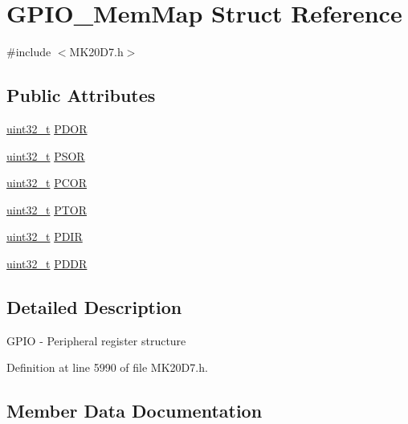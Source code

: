 \hypertarget{struct_g_p_i_o___mem_map}{}\section{G\+P\+I\+O\+\_\+\+Mem\+Map Struct Reference}
\label{struct_g_p_i_o___mem_map}


{\ttfamily \#include $<$M\+K20\+D7.\+h$>$}

\subsection*{Public Attributes}
\begin{DoxyCompactItemize}
\item 
\hyperlink{_p_e___types_8h_a33594304e786b158f3fb30289278f5af}{uint32\+\_\+t} \hyperlink{struct_g_p_i_o___mem_map_aaf4f486952b9b4680e270ce6266122fd}{P\+D\+OR}
\item 
\hyperlink{_p_e___types_8h_a33594304e786b158f3fb30289278f5af}{uint32\+\_\+t} \hyperlink{struct_g_p_i_o___mem_map_a14833f065ec123137ccce5ab873b5879}{P\+S\+OR}
\item 
\hyperlink{_p_e___types_8h_a33594304e786b158f3fb30289278f5af}{uint32\+\_\+t} \hyperlink{struct_g_p_i_o___mem_map_a996f6a159415a5c0d0683346e950e7fb}{P\+C\+OR}
\item 
\hyperlink{_p_e___types_8h_a33594304e786b158f3fb30289278f5af}{uint32\+\_\+t} \hyperlink{struct_g_p_i_o___mem_map_a03faa882b5f4554ff4c11954c2d8759b}{P\+T\+OR}
\item 
\hyperlink{_p_e___types_8h_a33594304e786b158f3fb30289278f5af}{uint32\+\_\+t} \hyperlink{struct_g_p_i_o___mem_map_a01933bea5d005bf126ea2e0345518763}{P\+D\+IR}
\item 
\hyperlink{_p_e___types_8h_a33594304e786b158f3fb30289278f5af}{uint32\+\_\+t} \hyperlink{struct_g_p_i_o___mem_map_a49dfaa95d08fa9178dd7f098c87f562d}{P\+D\+DR}
\end{DoxyCompactItemize}


\subsection{Detailed Description}
G\+P\+IO -\/ Peripheral register structure 

Definition at line 5990 of file M\+K20\+D7.\+h.



\subsection{Member Data Documentation}
